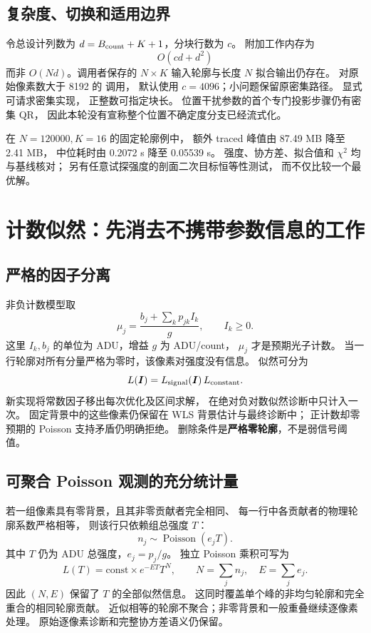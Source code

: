 \documentclass[UTF8,11pt,a4paper,fontset=fandol]{ctexart}
\begin{document}
\subsection{复杂度、切换和适用边界}

令总设计列数为 $d=B_{\rm count}+K+1$，分块行数为 $c$。
附加工作内存为
\[
O(cd+d^2)
\]
而非 $O(Nd)$。调用者保存的 $N\times K$ 输入轮廓与长度 $N$ 拟合输出仍存在。
对原始像素数大于 8192 的  调用，
默认使用 $c=4096$；小问题保留原密集路径。
显式  可请求密集实现，
正整数可指定块长。
位置干扰参数的首个专门投影步骤仍有密集 QR，
因此本轮没有宣称整个位置不确定度分支已经流式化。

在 $N=120000,K=16$ 的固定轮廓例中，
额外 traced 峰值由 87.49 MB 降至 2.41 MB，
中位耗时由 0.2072 s 降至 0.05539 s。
强度、协方差、拟合值和 $\chi^2$ 均与基线核对；
另有任意试探强度的剖面二次目标恒等性测试，
而不仅比较一个最优解。

\section{计数似然：先消去不携带参数信息的工作}

\subsection{严格的因子分离}

非负计数模型取
\[
\mu_j=\frac{b_j+\sum_kp_{jk}I_k}{g},\qquad I_k\ge0 .
\]
这里 $I_k,b_j$ 的单位为 ADU，增益 $g$ 为 ADU/count，
$\mu_j$ 才是预期光子计数。
当一行轮廓对所有分量严格为零时，该像素对强度没有信息。
似然可分为
\[
L(\bm I)=L_{\rm signal}(\bm I)\,L_{\rm constant}.
\]
新实现将常数因子移出每次优化及区间求解，
在绝对负对数似然诊断中只计入一次。
固定背景中的这些像素仍保留在 WLS 背景估计与最终诊断中；
正计数却零预期的 Poisson 支持矛盾仍明确拒绝。
删除条件是\textbf{严格零轮廓}，不是弱信号阈值。

\subsection{可聚合 Poisson 观测的充分统计量}

若一组像素具有零背景，且其非零贡献者完全相同、
每一行中各贡献者的物理轮廓系数严格相等，
则该行只依赖组总强度 $T$：
\[
n_j\sim\operatorname{Poisson}(e_jT).
\]
其中 $T$ 仍为 ADU 总强度，$e_j=p_j/g$。
独立 Poisson 乘积可写为
\[
L(T)=\text{const}\times e^{-ET}T^N,\qquad
N=\sum_j n_j,\quad E=\sum_j e_j.
\]
因此 $(N,E)$ 保留了 $T$ 的全部似然信息。
这同时覆盖单个峰的非均匀轮廓和完全重合的相同轮廓贡献。
近似相等的轮廓不聚合；非零背景和一般重叠继续逐像素处理。
原始逐像素诊断和完整协方差语义仍保留。
\end{document}
